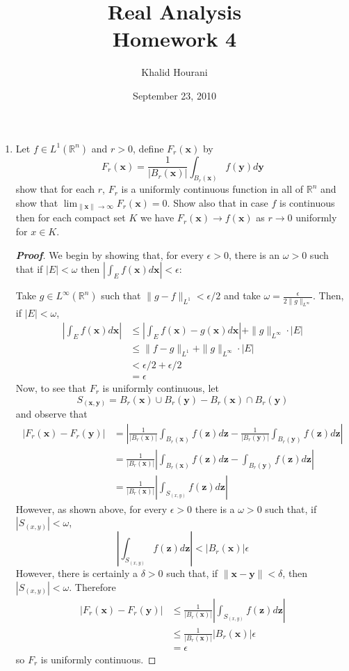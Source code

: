 \documentclass[12pt,leqno]{book}
\title{Real Analysis\\\large Homework 4}
\date{September 23, 2010}
\author{Khalid Hourani}
\theoremstyle{definition}
\newcommand{\R}{\mathbb{R}}
\newenvironment{Proof}{\begin{proof}[\textnormal{\textbf{Proof}}]}{\end{proof}}
\begin{document}
\begin{titlepage}
 \maketitle 
\end{titlepage}

\begin{enumerate}
 \item Let $f\in L^1(\R^n)$ and $r>0$, define $F_r(\mathbf{x})$ by \[F_r(\mathbf{x})=\frac{1}{|B_r(\mathbf{x})|}\int_{B_r(\mathbf{x})}f(\mathbf{y})d\mathbf{y}\] show that for each $r$, $F_r$ is a uniformly continuous function in all of $\R^n$ and show that $\displaystyle\lim_{\|\mathbf{x}\|\to\infty}F_r(\mathbf{x})=0$. Show also that in case $f$ is continuous then for each compact set $K$ we have $F_r(\mathbf{x})\to f(\mathbf{x})$ as $r\to0$ uniformly for $x\in K$.
\begin{Proof}
 We begin by showing that, for every $\epsilon>0$, there is an $\omega>0$ such that if $|E|<\omega$ then $|\int_Ef(\mathbf{x})d\mathbf{x}|<\epsilon$:

Take $g\in L^{\infty}(\R^n)$ such that $\|g-f\|_{L^1}<\epsilon/2$ and take $\omega=\frac{\epsilon}{2\|g\|_{L^{\infty}}}$. Then, if $|E|<\omega$, \begin{align*}\left|\int_Ef(\mathbf{x})d\mathbf{x}\right|&\leq\left|\int_Ef(\mathbf{x})-g(\mathbf{x})d\mathbf{x}\right|+\|g\|_{L^{\infty}}\cdot|E|\\&\leq\|f-g\|_{L^1}+\|g\|_{L^{\infty}}\cdot|E|\\&<\epsilon/2+\epsilon/2\\&=\epsilon\end{align*} Now, to see that $F_r$ is uniformly continuous, let \[S_{(\mathbf{x},\mathbf{y})}=B_r(\mathbf{x})\cup B_r(\mathbf{y})-B_r(\mathbf{x})\cap B_r(\mathbf{y})\] and observe that \begin{align*}\left|F_r(\mathbf{x})-F_r(\mathbf{y})\right|&=\left|\frac{1}{|B_r(\mathbf{x})|}\int_{B_r(\mathbf{x})}f(\mathbf{z})d\mathbf{z}-\frac{1}{|B_r(\mathbf{y})|}\int_{B_r(\mathbf{y})}f(\mathbf{z})d\mathbf{z}\right|\\&=\frac{1}{|B_r(\mathbf{x})|}\left|\int_{B_r(\mathbf{x})}f(\mathbf{z})d\mathbf{z}-\int_{B_r(\mathbf{y})}f(\mathbf{z})d\mathbf{z}\right|\\&=\frac{1}{|B_r(\mathbf{x})|}\left|\int_{S_{(x,y)}}f(\mathbf{z})d\mathbf{z}\right|\end{align*} However, as shown above, for every $\epsilon>0$ there is a $\omega>0$ such that, if $|S_{(x,y)}|<\omega$, \[\left|\int_{S_{(x,y)}}f(\mathbf{z})d\mathbf{z}\right|<|B_r(\mathbf{x})|\epsilon\] However, there is certainly a $\delta>0$ such that, if $\|\mathbf{x}-\mathbf{y}\|<\delta$, then $|S_{(x,y)}|<\omega$. Therefore \begin{align*}\left|F_r(\mathbf{x})-F_r(\mathbf{y})\right|&\leq\frac{1}{|B_r(\mathbf{x})|}\left|\int_{S_{(x,y)}}f(\mathbf{z})d\mathbf{z}\right|\\&\leq\frac{1}{|B_r(\mathbf{x})|}|B_r(\mathbf{x})|\epsilon\\&=\epsilon\end{align*} so $F_r$ is uniformly continuous. 


\end{Proof}
\end{enumerate}
\end{document}
